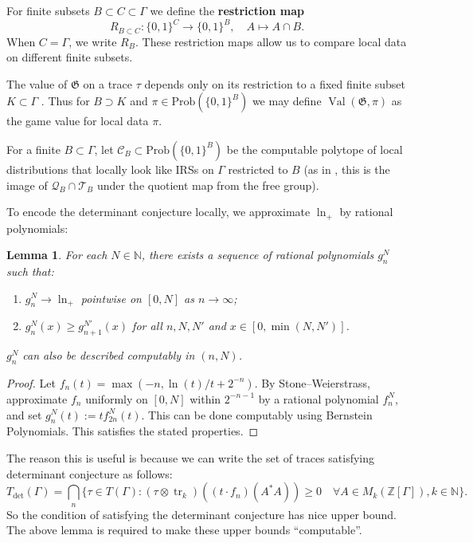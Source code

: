 \documentclass[pdflatex,sn-mathphys-num]{sn-jnl}%
\newtheorem{lemma}[theorem]{Lemma}
\DeclareMathOperator{\tr}{tr}
\DeclareMathOperator{\Val}{Val}
\begin{document}
For finite subsets $B \subset C \subset \Gamma$ we define the \textbf{restriction map}
\[
    R_{B \subset C} : \{0,1\}^C \to \{0,1\}^B,\quad
    A \mapsto A \cap B.
\]
When $C = \Gamma$, we write $R_B$. These restriction maps allow us to compare local data on different finite subsets.

The value of $\mathfrak{G}$ on a trace $\tau$ depends only on its restriction to a fixed finite subset $K \subset \Gamma$ \cite[Section~3.2]{manzoor_there_2025}.  
Thus for $B \supset K$ and $\pi \in \mathrm{Prob}(\{0,1\}^B)$ we may define $\Val(\mathfrak{G},\pi)$ as the game value for local data $\pi$.

For a finite $B \subset \Gamma$,  
let $\mathcal{C}_B \subset \mathrm{Prob}(\{0,1\}^B)$ be the computable polytope of local distributions that locally look like IRSs on $\Gamma$ restricted to $B$  
(as in \cite[Section~3.2]{manzoor_there_2025}, this is the image of $\mathcal{Q}_B\cap \mathcal{T}_B$ under the quotient map from the free group).

To encode the determinant conjecture locally,  
we approximate $\ln_+$ by rational polynomials:

\begin{lemma}
    For each $N \in \mathbb{N}$, there exists a sequence of rational polynomials $g_n^N$ such that:
    \begin{enumerate}
        \item $g_n^N \to \ln_+$ pointwise on $[0,N]$ as $n \to \infty$;
        \item $g_n^N(x) \geq g_{n+1}^{N'}(x)$ for all $n,N,N'$ and $x \in [0, \min(N,N')]$.
    \end{enumerate}
    $g_n^N$ can also be described computably in $(n,N)$.
\end{lemma}
\begin{proof}
    Let $f_n(t) = \max(-n, \ln(t)/t + 2^{-n})$.  
    By Stone--Weierstrass, approximate $f_n$ uniformly on $[0,N]$ within $2^{-n-1}$ by a rational polynomial $f_n^N$,  
    and set $g_n^N(t) := t f_{2n}^N(t)$. This can be done computably using Bernstein Polynomials. 
    This satisfies the stated properties.
\end{proof}

The reason this is useful is because we can write the set of traces satisfying determinant conjecture as follows:
\[T_{\mathrm{det}}(\Gamma) = \bigcap_n \{\tau \in T(\Gamma): (\tau\otimes \tr_k)((t\cdot f_n)(A^*A))\geq 0\quad \forall A\in M_k(\mathbb{Z}[\Gamma]), k\in \mathbb{N}\}.\]
So the condition of satisfying the determinant conjecture has nice upper bound. The above lemma is required to make these upper bounds ``computable''.
\end{document}
